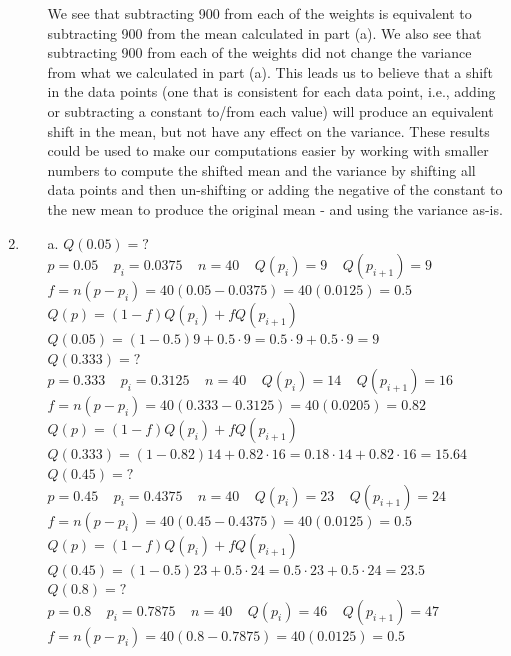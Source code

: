 \documentclass[12pt]{article}
\begin{document}
\begin{enumerate}
\begin{itemize}
We see that subtracting 900 from each of the weights is equivalent to subtracting 900 from the mean calculated in part (a). We also see that subtracting 900 from each of the weights did not change the variance from what we calculated in part (a). This leads us to believe that a shift in the data points (one that is consistent for each data point, i.e., adding or subtracting a constant to/from each value) will produce an equivalent shift in the mean, but not have any effect on the variance. These results could be used to make our computations easier by working with smaller numbers to compute the shifted mean and the variance by shifting all data points and then un-shifting or adding the negative of the constant to the new mean to produce the original mean - and using the variance as-is.
\end{itemize}
\item
\begin{itemize}
\item[a.]$Q(0.05)=?$\\
$p=0.05 \;\;\;\; p_i=0.0375 \;\;\;\; n=40 \;\;\;\;  Q(p_i)=9 \;\;\;\; Q(p_{i+1})=9$\\
$f=n(p-p_i)=40(0.05-0.0375)=40(0.0125)=0.5$\\
$Q(p)=(1-f)Q(p_i)+fQ(p_{i+1})$\\
$Q(0.05)=(1-0.5)9+0.5\cdot9=0.5\cdot9+0.5\cdot9=9$\\[0.1in]
$Q(0.333)=?$\\
$p=0.333 \;\;\;\; p_i=0.3125 \;\;\;\; n=40 \;\;\;\; Q(p_i)=14 \;\;\;\; Q(p_{i+1})=16$\\
$f=n(p-p_i)=40(0.333-0.3125)=40(0.0205)=0.82$\\
$Q(p)=(1-f)Q(p_i)+fQ(p_{i+1})$\\
$Q(0.333)=(1-0.82)14+0.82\cdot16=0.18\cdot14+0.82\cdot16=15.64$\\[0.1in]
$Q(0.45)=?$\\
$p=0.45 \;\;\;\; p_i=0.4375 \;\;\;\; n=40 \;\;\;\; Q(p_i)=23 \;\;\;\; Q(p_{i+1})=24$\\
$f=n(p-p_i)=40(0.45-0.4375)=40(0.0125)=0.5$\\
$Q(p)=(1-f)Q(p_i)+fQ(p_{i+1})$\\
$Q(0.45)=(1-0.5)23+0.5\cdot24=0.5\cdot23+0.5\cdot24=23.5$\\[0.1in]
$Q(0.8)=?$\\
$p=0.8 \;\;\;\; p_i=0.7875 \;\;\;\; n=40 \;\;\;\; Q(p_i)=46 \;\;\;\; Q(p_{i+1})=47$\\
$f=n(p-p_i)=40(0.8-0.7875)=40(0.0125)=0.5$\\

\end{itemize}
\end{enumerate}
\end{document}
